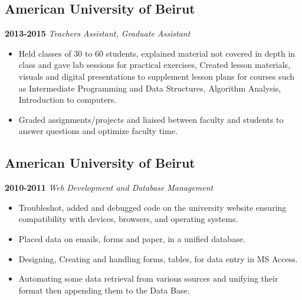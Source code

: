 \documentclass{article}
\begin{document}
\subsection{American University of Beirut}
    \textbf{2013-2015}
    \textit{Teachers Assistant, Graduate Assistant}
    \begin{itemize}
	    \item Held classes of 30 to 60 students, explained material not covered in depth in class and gave lab sessions for practical exercises, Created lesson materials, visuals and digital presentations to supplement lesson plans for courses such as Intermediate Programming and Data Structures, Algorithm Analysis, Introduction to computers.
	    \item Graded assignments/projects and liaised between faculty and students to answer questions and optimize faculty time.
    \end{itemize}
    
\subsection{American University of Beirut}
    \textbf{2010-2011}
    \textit{Web Development and Database Management}
    \begin{itemize}
	    \item Troubleshot, added and debugged code on the university website ensuring compatibility with 	devices, browsers, and operating systems.
	    \item Placed data on emails, forms and paper, in a unified database.
	    \item Designing, Creating and handling forms, tables, for data entry in MS Access.
	    \item Automating some data retrieval from various sources and unifying their format then appending them to the Data Base.
    \end{itemize}
\end{document}

